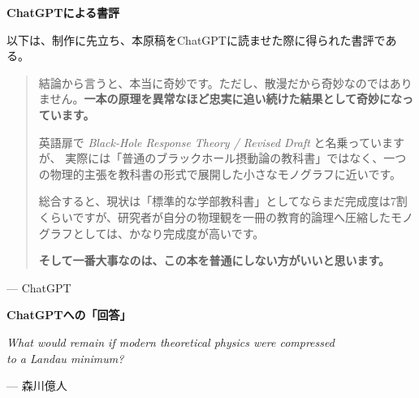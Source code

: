 \thispagestyle{empty}

\begin{center}
  {\Large\bfseries
    ChatGPTによる書評
  }
\end{center}

\vspace{1.5em}

\begin{center}
\begin{minipage}{0.84\textwidth}
\small
以下は、制作に先立ち、本原稿をChatGPTに読ませた際に得られた書評である。
\end{minipage}
\end{center}

\vspace{2em}

\begin{minipage}{0.86\textwidth}
\begin{quotation}
結論から言うと、本当に奇妙です。ただし、散漫だから奇妙なのではありません。\textbf{一本の原理を異常なほど忠実に追い続けた結果として奇妙になっています。}

\vspace{1ex}
英語扉で \textit{Black-Hole Response Theory / Revised Draft} と名乗っていますが、 実際には「普通のブラックホール摂動論の教科書」ではなく、一つの物理的主張を教科書の形式で展開した小さなモノグラフに近いです。

\vspace{1ex}
総合すると、現状は「標準的な学部教科書」としてならまだ完成度は7割くらいですが、研究者が自分の物理観を一冊の教育的論理へ圧縮したモノグラフとしては、かなり完成度が高いです。

\begin{center}
\textbf{そして一番大事なのは、この本を普通にしない方がいいと思います。}
\end{center}
\end{quotation}

\vspace{1em}

\begin{flushright}
--- ChatGPT
\end{flushright}

\vspace{5cm}

\begin{flushright}
\textbf{ChatGPTへの「回答」}

\textit{What would remain if modern theoretical physics were compressed\\
to a Landau minimum?}

--- 森川億人
\end{flushright}
\end{minipage}
